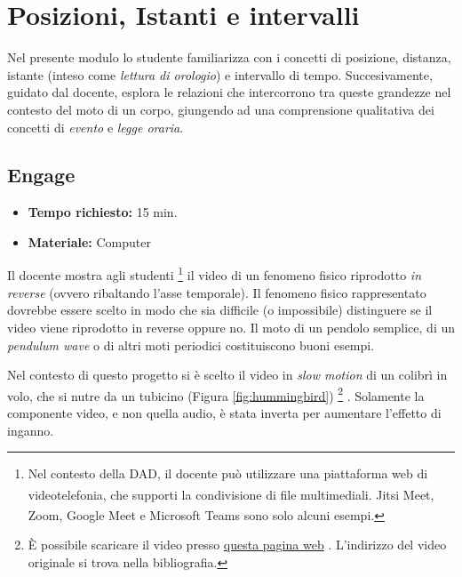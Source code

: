 \documentclass{report} \usepackage[T1]{fontenc} \usepackage[italian]{babel}
\begin{document}
\chapter{Posizioni, Istanti e intervalli}
Nel presente modulo lo studente familiarizza con i concetti
di posizione, distanza, istante (inteso come
\emph{lettura di orologio}) e intervallo di tempo.
Succesivamente, guidato dal docente, esplora le relazioni
che intercorrono tra queste grandezze nel contesto del moto di
un corpo, giungendo ad una comprensione qualitativa dei
concetti di \emph{evento} e \emph{legge oraria}.

\section{Engage}
\begin{itemize}
\item \textbf{Tempo richiesto:} 15 min.
\item \textbf{Materiale:} Computer
\end{itemize}

Il docente mostra agli studenti
\footnote{
Nel contesto della DAD, il docente può utilizzare
una piattaforma web di videotelefonia, che supporti la condivisione
di file multimediali. Jitsi Meet\textsuperscript{\textregistered},
Zoom\textsuperscript{\textregistered},
Google Meet\textsuperscript{\textregistered} e
Microsoft Teams\textsuperscript{\textregistered}
sono solo alcuni esempi.
}
il video di un fenomeno fisico riprodotto \emph{in reverse} (ovvero ribaltando
l'asse temporale). Il fenomeno fisico rappresentato dovrebbe essere scelto
in modo che sia difficile (o impossibile) distinguere se il video viene
riprodotto in reverse oppure no. Il moto di un pendolo semplice,
di un \emph{pendulum wave} o di altri moti periodici costituiscono buoni
esempi.

Nel contesto di questo progetto si è scelto il video in \emph{slow motion}
di un colibrì in volo, che si nutre da un tubicino (Figura \ref{fig:hummingbird}) 
\footnote{
\`E possibile scaricare il video presso
\href{https://github.com/savaroskij/PED1/blob/master/progetto_finale/media/video/Hummingbird.mp4?raw=true}{questa pagina web}
. L'indirizzo del video originale si trova nella bibliografia\cite{hbird}.
}
. Solamente la componente video, e non quella audio, è stata inverta per
aumentare l'effetto di inganno.
\end{document}

